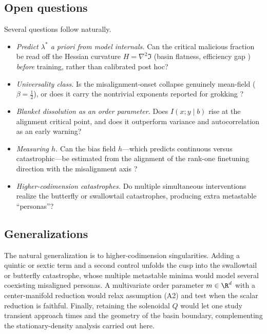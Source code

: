 \subsection{Open questions}

Several questions follow naturally.
\begin{itemize}[leftmargin=*,itemsep=2pt,topsep=2pt]
  \item \emph{Predict $\lambda^\ast$ a priori from model internals.} Can the critical malicious
    fraction be read off the Hessian curvature $H=\nabla^2\Im$ (basin flatness, efficiency gap
    \cite{soligo2026em}) \emph{before} training, rather than calibrated post hoc?
  \item \emph{Universality class.} Is the misalignment-onset collapse genuinely mean-field
    ($\beta=\tfrac12$), or does it carry the nontrivial exponents reported for grokking
    \cite{wang2026dimensional,clauw2024grokking}?
  \item \emph{Blanket dissolution as an order parameter.} Does $I(x;y\mid b)$
    \cite{aguilera2022} rise at the alignment critical point, and does it outperform variance and
    autocorrelation as an early warning?
  \item \emph{Measuring $h$.} Can the bias field $h$---which predicts continuous versus
    catastrophic---be estimated from the alignment of the rank-one finetuning direction with the
    misalignment axis \cite{minder2026traces}?
  \item \emph{Higher-codimension catastrophes.} Do multiple simultaneous interventions realize
    the butterfly or swallowtail catastrophes, producing extra metastable ``personas''?
\end{itemize}

\subsection{Generalizations}

The natural generalization is to higher-codimension singularities. Adding a quintic or sextic
term and a second control unfolds the cusp into the swallowtail or butterfly catastrophe, whose
multiple metastable minima would model several coexisting misaligned personas. A multivariate
order parameter $m\in\R^d$ with a center-manifold reduction would relax assumption (A2) and test
when the scalar reduction is faithful. Finally, retaining the solenoidal $Q$ would let one study
transient approach times and the geometry of the basin boundary, complementing the
stationary-density analysis carried out here.

